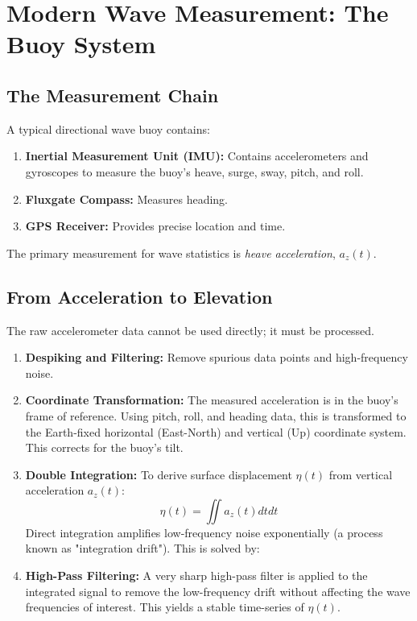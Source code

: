 \documentclass[11pt,letterpaper]{article}
\begin{document}
\section{Modern Wave Measurement: The Buoy System}
\subsection{The Measurement Chain}
A typical directional wave buoy contains:
\begin{enumerate}
    \item \textbf{Inertial Measurement Unit (IMU):} Contains accelerometers and gyroscopes to measure the buoy's heave, surge, sway, pitch, and roll.
    \item \textbf{Fluxgate Compass:} Measures heading.
    \item \textbf{GPS Receiver:} Provides precise location and time.
\end{enumerate}
The primary measurement for wave statistics is \textit{heave acceleration}, $a_z(t)$.

\subsection{From Acceleration to Elevation}
The raw accelerometer data cannot be used directly; it must be processed.
\begin{enumerate}
    \item \textbf{Despiking and Filtering:} Remove spurious data points and high-frequency noise.
    \item \textbf{Coordinate Transformation:} The measured acceleration is in the buoy's frame of reference. Using pitch, roll, and heading data, this is transformed to the Earth-fixed horizontal (East-North) and vertical (Up) coordinate system. This corrects for the buoy's tilt.
    \item \textbf{Double Integration:} To derive surface displacement $\eta(t)$ from vertical acceleration $a_z(t)$:
    \begin{equation}
    \eta(t) = \iint a_z(t)  dt  dt
    \end{equation}
    Direct integration amplifies low-frequency noise exponentially (a process known as "integration drift"). This is solved by:
    \item \textbf{High-Pass Filtering:} A very sharp high-pass filter is applied to the integrated signal to remove the low-frequency drift without affecting the wave frequencies of interest. This yields a stable time-series of $\eta(t)$.
\end{enumerate}
\end{document}
